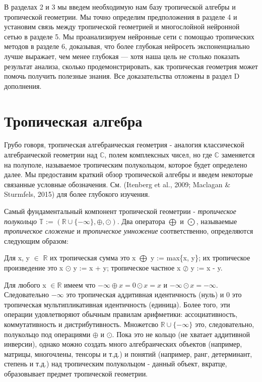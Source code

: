\documentclass[russian]{lecture-notes}
\begin{document}
	В разделах 2 и 3 мы введем необходимую нам базу тропической алгебры и тропической геометрии. Мы точно определим предположения в разделе 4 и установим связь между тропической геометрией и многослойной нейронной сетью в разделе 5. Мы проанализируем нейронные сети с помощью тропических методов в разделе 6, доказывая, что более глубокая нейросеть экспоненциально лучше выражает, чем менее глубокая --- хотя наша цель не столько показать результат анализа, сколько продемонстрировать, как тропическая геометрия может помочь получить полезные знания. Все доказательства отложены в раздел D дополнения.
	
	\section{Тропическая алгебра}
	
	Грубо говоря, тропическая алгебраическая геометрия - аналогия классической алгебраической геометрии над $\mathbb{C}$, полем комплексных чисел, но где $\mathbb{C}$ заменяется на полуполе, называемое тропическим полукольцом, которое будет определено далее. Мы предоставим краткий обзор тропической алгебры и введем некоторые связанные условные обозначения. См. (Itenberg et al., 2009; Maclagan \& Sturmfels,
	2015) для более глубокого изучения.
	
	Самый фундаментальный компонент тропической геометрии - \textit{тропическое полукольцо} $\mathbb{T}$ := $ (\mathbb{R} \cup \{- \infty \}, \oplus, \odot)$. Два оператора $\bigoplus$ и $\bigodot$, называемые \textit{тропическое сложение} и \textit{тропическое умножение} соответственно, определяются следующим образом:
	
	\begin{Definition}
		Для x, y $\in $ $ \mathbb{R}$ их тропическая сумма это x $\bigoplus$ y := max\{x, y\}; их тропическое произведение это x $\odot$ y := x + y; тропическое частное x $\oslash$ y := x - y.
	\end{Definition}

	Для любого x $\in \mathbb{R}$ имеем что $- \infty \oplus x = 0 \odot x = x$ и $- \infty \odot x = - \infty $. Следовательно $ - \infty$ это тропическая аддитивная идентичность (нуль) и 0 это тропическая мультипликативная идентичность (единица). Более того, эти операции удовлетворяют обычным правилам арифметики: ассоциативность, коммутативность и дистрибутивность. Множетсво $ \mathbb{R} \cup \{ - \infty\} $ это, следовательно, полукольцо под операциями $\oplus$ и $\odot$. Пока это не кольцо (не хватает аддитивной инверсии), однако можно создать много алгебраических объектов (например, матрицы, многочлены, тенсоры и т.д.) и понятий (например, ранг, детерминант, степень и т.д.) над тропическим полукольцом - данный объект, вкратце, образовывает предмет тропической геометрии.
	
\end{document}
